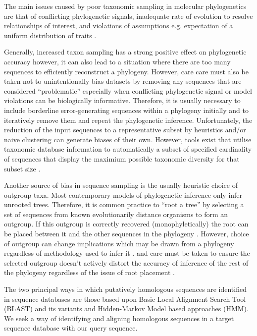 The main issues caused by poor taxonomic sampling in molecular phylogenetics are that
of conflicting phylogenetic signals, inadequate rate of evolution to resolve relationships
of interest, and violations of assumptions e.g. expectation of a uniform distribution of traits \citep{Nabhan2012}.


Generally, increased taxon sampling has a strong positive effect on phylogenetic accuracy \citep{Zwickl2002}
however, it can also lead to a situation where there are too many sequences to efficiently
reconstruct a phylogeny.
However, care care must also be taken not to unintentionally bias datasets by removing 
any sequences that are considered ``problematic'' especially when conflicting phylogenetic signal
or model violations can be biologically informative.  Therefore, it is usually necessary to include
borderline error-generating sequences within a phylogeny initially and to iteratively remove them
and repeat the phylogenetic inference.  Unfortunately, the reduction of the input sequences
to a representative subset by heuristics and/or naive clustering can generate
biases of their own.  However, tools exist that utilise taxonomic database 
information to automatically a subset of specified cardinality of sequences 
that display the maximium possible taxonomic diversity for that subset size \citep{Zhou2014}.


Another source of bias in sequence sampling is the usually heuristic choice
of outgroup taxa. Most contemporary models of phylogenetic inference only infer unrooted trees. 
Therefore, it is common practice to ``root a tree'' by selecting a set of sequences from known evolutionarily distance
organisms to form an outgroup. If this outgroup is correctly recovered (monophyletically) the root can be placed between
it and the other sequences in the phylogeny \citep{Yang2012}.  
However, choice of outgroup can change implications which may be drawn from
a phylogeny regardless of methodology used to infer it \citep{Milinkovitch1996}.
and care must be taken to ensure the selected outgroup doesn't actively
distort the accuracy of inference of the rest of the phylogeny regardless
of the issue of root placement \citep{Milinkovitch1998}.

The two principal ways in which putatively homologous sequences are identified in
sequence databases are those based upon Basic Local Alignment Search Tool (BLAST) and
its variants and Hidden-Markov Model based approaches (HMM).
We seek a way of identifying and aligning homologous sequences in 
a target sequence database with our query sequence.

